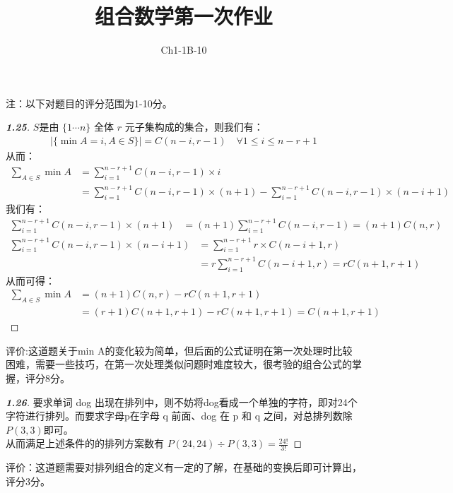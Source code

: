 \documentclass[12pt]{article}
\begin{document}
 
 
\title{组合数学第一次作业}
\author{Ch1-1B-10}

\maketitle

注：以下对题目的评分范围为1-10分。
\begin{proof}[\textbf{1.25}]
    $S$是由 $\{1 \cdots n\}$ 全体 $r$ 元子集构成的集合，则我们有：
    \begin{align*}
        |\{\min A = i, A \in S\}| = C(n-i, r-1) \quad \forall 1 \leq i \leq n-r+1 
    \end{align*}
    从而：
    \begin{align*}
        \sum_{A \in S} \min A &= \sum_{i = 1}^{n-r+1} C(n-i, r-1) \times i \\
        &= \sum_{i = 1}^{n-r+1} C(n-i, r-1) \times (n + 1) - \sum_{i = 1}^{n-r+1} C(n-i, r-1) \times (n - i + 1)
    \end{align*}
    我们有：
    \begin{align*}
        \sum_{i = 1}^{n-r+1} C(n-i, r-1) \times (n + 1) &= (n+1)\sum_{i = 1}^{n-r+1} C(n-i, r-1) = (n+1)C(n,r)
    \end{align*}
     \begin{align*}
        \sum_{i = 1}^{n-r+1} C(n-i, r-1) \times (n -i + 1) &= \sum_{i = 1}^{n-r+1} r \times C(n-i+1, r)\\
        &= r\sum_{i = 1}^{n-r+1} C(n-i+1, r) = rC(n+1,r+1)
    \end{align*}
    从而可得：
    \begin{align*}
        \sum_{A \in S} \min A &= (n+1)C(n,r) - rC(n+1,r+1) \\
        &= (r+1)C(n+1,r+1) - rC(n+1,r+1) = C(n+1,r+1)
    \end{align*}
\end{proof}
评价:这道题关于min A的变化较为简单，但后面的公式证明在第一次处理时比较困难，需要一些技巧，在第一次处理类似问题时难度较大，很考验的组合公式的掌握，评分8分。

\begin{proof}[\textbf{1.26}]
    要求单词 dog 出现在排列中，则不妨将dog看成一个单独的字符，即对24个字符进行排列。而要求字母p在字母 q
前面、dog 在 p 和 q 之间，对总排列数除$P(3,3)$即可。\\
    从而满足上述条件的的排列方案数有 $P(24,24) \div P(3,3) = \frac{24!}{3!}$
\end{proof}
评价：这道题需要对排列组合的定义有一定的了解，在基础的变换后即可计算出，评分3分。
\end{document}
